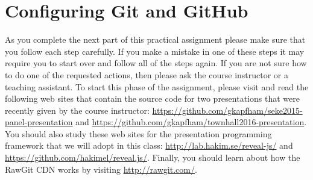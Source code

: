 \section*{Configuring Git and GitHub}

As you complete the next part of this practical assignment please make sure that you follow each step carefully. If you
make a mistake in one of these steps it may require you to start over and follow all of the steps again. If you are not
sure how to do one of the requested actions, then please ask the course instructor or a teaching assistant. To start
this phase of the assignment, please visit and read the following web sites that contain the source code for two
presentations that were recently given by the course instructor:
\url{https://github.com/gkapfham/seke2015-panel-presentation} and
\url{https://github.com/gkapfham/townhall2016-presentation}. You should also study these web sites for the presentation
programming framework that we will adopt in this class: \url{http://lab.hakim.se/reveal-js/} and
\url{https://github.com/hakimel/reveal.js/}. Finally, you should learn about how the RawGit CDN works by visiting
\url{http://rawgit.com/}.

